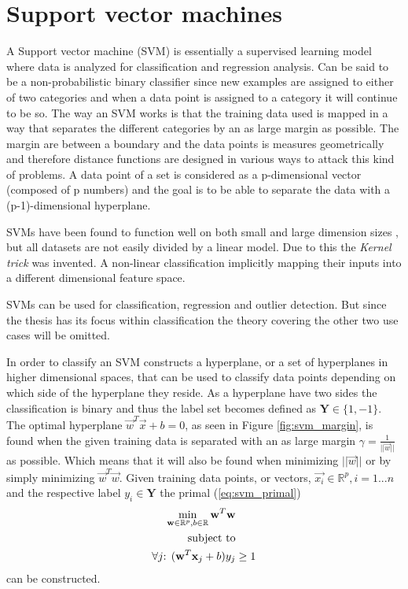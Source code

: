 \section{Support vector machines}
\label{sec:mltheory:svm}

A Support vector machine (SVM) is essentially a supervised learning model where data is analyzed for classification and regression analysis. Can be said to be a non-probabilistic binary classifier since new examples are assigned to either of two categories and when a data point is assigned to a category it will continue to be so. The way an SVM works is that the training data used is mapped in a way that separates the different categories by an as large margin as possible. The margin are between a boundary and the data points is measures geometrically and therefore distance functions are designed in various ways to attack this kind of problems.
A data point of a set is considered as a p-dimensional vector (composed of p numbers) and the goal is to be able to separate the data with a (p-1)-dimensional hyperplane. 

SVMs have been found to function well on both small and large dimension sizes \cite{vert2005kernel}, but all datasets are not easily divided by a linear model.  Due to this the \emph{Kernel trick} was invented. A non-linear classification implicitly mapping their inputs into a different dimensional feature space.

SVMs can be used for classification, regression and outlier detection. But since the thesis has its focus within classification the theory covering the other two use cases will be omitted. 

In order to classify an SVM constructs a hyperplane, or a set of hyperplanes in higher dimensional spaces, that can be used to classify data points depending on which side of the hyperplane they reside. As a hyperplane have two sides the classification is binary and thus the label set becomes defined as $\mathbf{Y} \in \{1,-1\}$. The optimal hyperplane $\vec{w}^T\vec{x}+b = 0$, as seen in Figure \ref{fig:svm_margin}, is found when the given training data is separated with an as large margin $\gamma = \frac{1}{||{\vec{w}||}}$ as possible. Which means that it will also be found when minimizing $||\vec{w}||$ or by simply minimizing $\vec{w}^T\vec{w}$. 
Given training data points, or vectors, $\vec{x_i} \in \mathbb{R}^p, i=1...n$ and the respective label $y_i \in \mathbf{Y}$ the primal (\ref{eq:svm_primal})
\begin{equation}
\label{eq:svm_primal}
\begin{split}
\min_{\vec{w}\in\mathbb{R}^p,b\in\mathbb{R}}{\vec{w}^T\vec{w}}& \\
\textnormal{subject to} & \\
\forall j\textnormal{: } (\vec{w}^T\vec{x}_j + b)y_j & \geq 1
\end{split}
\end{equation}
can be constructed.

